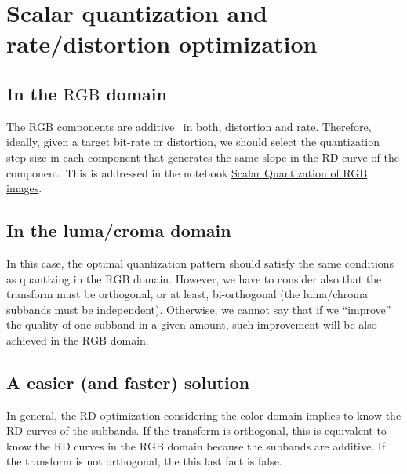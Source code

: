 \section{Scalar quantization and rate/distortion optimization}

\subsection{In the $\text{RGB}$ domain}

The $\text{RGB}$ components are additive~\cite{burger2016digital} in
both, distortion and rate. Therefore, ideally, given a target bit-rate
or distortion, we should select the quantization step size in each
component that generates the same slope in the RD curve of the
component. This is addressed in the notebook
\href{https://github.com/vicente-gonzalez-ruiz/color_transforms/blob/main/docs/RGB/RGB_SQ.ipynb}{Scalar
  Quantization of RGB images}.

\subsection{In the luma/croma domain}

In this case, the optimal quantization pattern should satisfy the same
conditions as quantizing in the $\text{RGB}$ domain. However, we have
to consider also that the transform must be orthogonal, or at least,
bi-orthogonal (the luma/chroma subbands must be
independent). Otherwise, we cannot say that if we ``improve'' the
quality of one subband in a given amount, such improvement will be
also achieved in the $\text{RGB}$ domain.

\subsection{A easier (and faster) solution}

In general, the RD optimization considering the color domain implies
to know the RD curves of the subbands. If the transform is orthogonal,
this is equivalent to know the RD curves in the $\text{RGB}$ domain
because the subbands are additive. If the transform is not
orthogonal, the this last fact is false.

